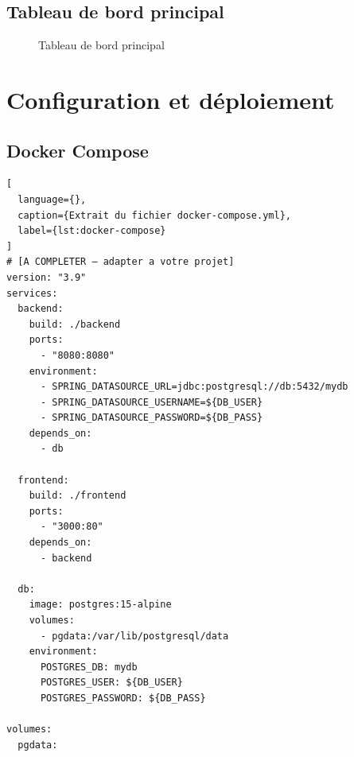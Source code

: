 \subsection{Tableau de bord principal}

\begin{figure}[H]
  \centering
  \caption{Tableau de bord principal}
  \label{fig:ui-dashboard}
\end{figure}


\subsection{}

\begin{figure}[H]
  \centering
  \caption{}
  \label{fig:ui-page3}
\end{figure}

\section{Configuration et déploiement}
\label{sec:real:deploiement}

\subsection{Docker Compose}

\begin{lstlisting}[
  language={},
  caption={Extrait du fichier docker-compose.yml},
  label={lst:docker-compose}
]
# [A COMPLETER — adapter a votre projet]
version: "3.9"
services:
  backend:
    build: ./backend
    ports:
      - "8080:8080"
    environment:
      - SPRING_DATASOURCE_URL=jdbc:postgresql://db:5432/mydb
      - SPRING_DATASOURCE_USERNAME=${DB_USER}
      - SPRING_DATASOURCE_PASSWORD=${DB_PASS}
    depends_on:
      - db

  frontend:
    build: ./frontend
    ports:
      - "3000:80"
    depends_on:
      - backend

  db:
    image: postgres:15-alpine
    volumes:
      - pgdata:/var/lib/postgresql/data
    environment:
      POSTGRES_DB: mydb
      POSTGRES_USER: ${DB_USER}
      POSTGRES_PASSWORD: ${DB_PASS}

volumes:
  pgdata:
\end{lstlisting}


